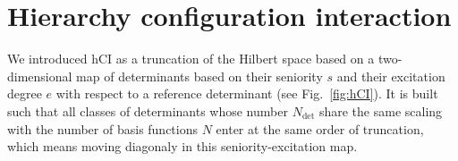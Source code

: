 \documentclass[aip,jcp,reprint,noshowkeys,superscriptaddress]{revtex4-1}
\newcommand{\Ndet}{N_\text{det}}
\begin{document}
\section{Hierarchy configuration interaction}
\label{sec:hCI}

We introduced hCI \cite{Kossoski_2022} as a truncation of the Hilbert space based on a two-dimensional map of determinants 
based on their seniority $s$ and their excitation degree $e$ with respect to a reference determinant (see Fig.~\ref{fig:hCI}).
It is built such that all classes of determinants whose number $\Ndet$ share the same scaling with the number of basis functions $N$ enter at the same order of truncation,
which means moving diagonaly in this seniority-excitation map.

\end{document}
